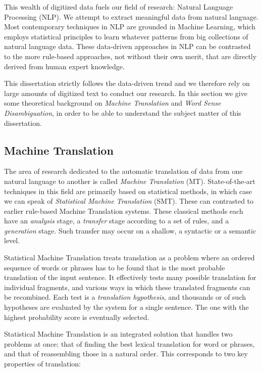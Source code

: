 This wealth of digitized data fuels our field of research: Natural Language
Processing (NLP). We attempt to extract meaningful data from natural language.
Most contemporary techniques in NLP are grounded in Machine Learning, which
employs statistical principles to learn whatever patterns from big collections
of natural language data. These data-driven approaches in NLP can be contrasted
to the more rule-based approaches, not without their own merit, that are
directly derived from human expert knowledge.

This dissertation strictly follows the data-driven trend and we therefore rely
on large amounts of digitized text to conduct our research. In this section we
give some theoretical background on \emph{Machine Translation} and \emph{Word
Sense Disambiguation}, in order to be able to understand the subject matter of
this dissertation.

\subsection{Machine Translation}
\label{sec:intromt}

The area of research dedicated to the automatic translation of data from one
natural language to another is called \emph{Machine Translation} (MT).
State-of-the-art techniques in this field are primarily based on statistical
methods, in which case we can speak of \emph{Statistical Machine Translation}
(SMT). These can contrasted to earlier rule-based Machine Translation systems.
These classical methods each have an \emph{analysis} stage, a \emph{transfer}
stage according to a set of rules, and a \emph{generation} stage. Such transfer may occur on a shallow, a syntactic or a semantic level. 

Statistical Machine Translation treats translation as a problem where an
ordered sequence of words or phrases has to be found that is the most probable
translation of the input sentence. It effectively tests many possible
translation for individual fragments, and various ways in which these
translated fragments can be recombined. Each test is a \emph{translation
hypothesis}, and thousands or of such hypotheses are evaluated by the system
for a single sentence. The one with the highest probability score is eventually
selected.

Statistical Machine Translation is an integrated solution that handles two
problems at once; that of finding the best lexical translation for word or
phrases, and that of reassembling those in a natural order. This corresponds to
two key properties of translation:

